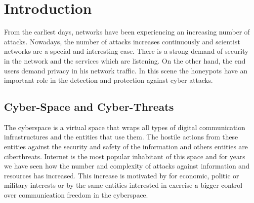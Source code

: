 \documentclass[a4paper]{llncs}
\begin{document}
\section{Introduction}

From the earliest days, %
  networks have been experiencing an increasing number of
  attacks. Nowadays, %
the number of attacks increases continuously\cite{cni-ccn-tendencias}\cite{esset-tendencias} and scientist networks are a special and interesting case. %
There is a strong demand of security in the network and the services which are listening. On the other hand, the end users demand privacy in his network traffic. In this scene the honeypots have an important role in the detection and protection against cyber attacks.

\subsection{Cyber-Space and Cyber-Threats}
\label{sect:Scientist Networks}

The cyberspace is a virtual space that wraps all types of digital
communication  infrastructures and the entities that use them. The
hostile actions from these entities against the security and safety of the information and others entities are ciberthreats. Internet is the most popular inhabitant of this space and for years we have seen how
the number and complexity of attacks against information and resources has increased. This increase is motivated by for economic, politic or military interests or by the same entities interested in exercise a bigger control over communication freedom in the cyberspace.  %
\end{document}
